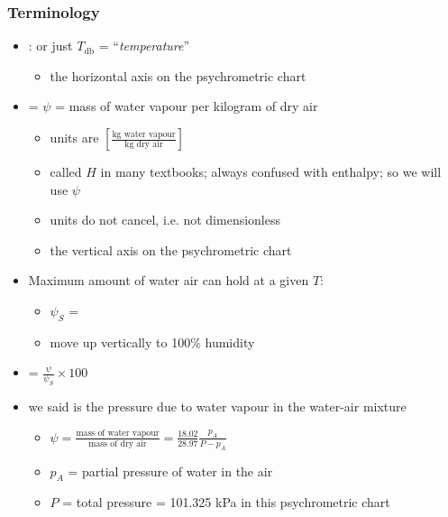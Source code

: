 \begin{frame}\frametitle{Terminology}
	\begin{itemize}
		\item	{\color{purple}{Dry bulb temperature}}: or just $T_\text{db}$ = ``\emph{temperature}''
		\begin{itemize}
			\item	the horizontal axis on the psychrometric chart
		\end{itemize}
		\item	{\color{purple}{Humidity}} = $\psi$ = mass of water vapour per kilogram of dry air
		\begin{itemize}
			\item	units are $ \left[ \displaystyle \frac{\text{kg water vapour}}{\text{kg dry air}}\right]$
			\item	called $H$ in many textbooks; always confused with enthalpy; so we will use $\psi$
			\item	units do not cancel, i.e. not dimensionless
			\item	the vertical axis on the psychrometric chart
		\end{itemize}
		\item	Maximum amount of water air can hold at a given $T$:
			\begin{itemize}
				\item	$\psi_S$ = {\color{purple}{saturation humidity}}
				\item	move up vertically to 100\% humidity
			\end{itemize}
		\item	{\color{purple}{Percentage humidity}} = $\displaystyle \frac{\psi}{\psi_S}\times 100$
		\vspace{4pt}
		\item	{\color{purple}{Partial pressure}} we said is the pressure due to water vapour in the water-air mixture
		\vspace{0pt}
		\begin{itemize}
			\item	$\psi = \displaystyle \frac{\text{mass of water vapour}}{\text{mass of dry air}} = \displaystyle \frac{18.02}{28.97}\frac{p_A}{P-p_A}$
			\item	$p_A$ = partial pressure of water in the air
			\item	$P$ = total pressure = 101.325 kPa in this psychrometric chart
		\end{itemize}
	\end{itemize}
\end{frame}


